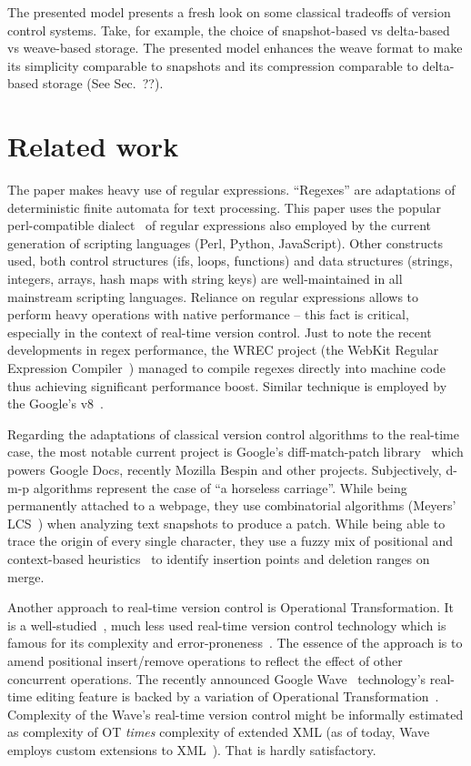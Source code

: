 \documentclass[twocolumn]{article}
\begin{document}
The presented model presents a fresh look on some classical tradeoffs of version control systems. Take, for example, the choice of snapshot-based vs delta-based vs weave-based storage. The presented model enhances the weave format to make its simplicity comparable to snapshots and its compression comparable to delta-based storage (See Sec.~??).


\section{Related work}

The paper makes heavy use of regular expressions. ``Regexes'' are adaptations of deterministic finite automata for text processing. This paper uses the popular perl-compatible dialect~\cite{pcre} of regular expressions also employed by the current generation of scripting languages (Perl, Python, JavaScript). Other constructs used, both control structures (ifs, loops, functions) and data structures (strings, integers, arrays, hash maps with string keys) are well-maintained in all mainstream scripting languages. Reliance on regular expressions allows to perform heavy operations with native performance -- this fact is critical, especially in the context of real-time version control.
Just to note the recent developments in regex performance, the WREC project (the WebKit Regular Expression Compiler~\cite{wrec}) managed to compile regexes directly into machine code thus achieving significant performance boost. Similar technique is employed by the Google's v8~\cite{v8-change-log}.

Regarding the adaptations of classical version control algorithms to the real-time case, the most notable current project is Google's diff-match-patch library~\cite{dmp} which powers Google Docs, recently Mozilla Bespin and other projects. Subjectively, d-m-p algorithms represent the case of ``a horseless carriage''. While being permanently attached to a webpage, they use combinatorial algorithms (Meyers' LCS~\cite{meyers}) when analyzing text snapshots to produce a patch. While being able to trace the origin of every single character, they use a fuzzy mix of positional and context-based heuristics~\cite{fraser-merge} to identify insertion points and deletion ranges on merge.

Another approach to real-time version control is Operational Transformation. It is a well-studied~\cite{ot1,ot2,ot3}, much less used real-time version control technology which is famous for its complexity and error-proneness~\cite{ot-mistakes}. The essence of the approach is to amend positional insert/remove operations to reflect the effect of other concurrent operations. The recently announced Google Wave~\cite{wave} technology's real-time editing feature is backed by a variation of Operational Transformation~\cite{waveot}. Complexity of the Wave's real-time version control might be informally estimated as complexity of OT \emph{times} complexity of extended XML (as of today, Wave employs custom extensions to XML~\cite{wavexml}). That is hardly satisfactory.
\end{document}
